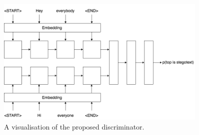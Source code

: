 \documentclass[11pt,a4paper]{article}
\begin{document}
    \begin{figure}[htp]
      \centering
      \includegraphics[width=0.9\textwidth]{discriminator.png}
      \caption{A visualisation of the proposed discriminator. }
      \label{discriminator}
    \end{figure}

\bigskip

\clearpage


\end{document}
